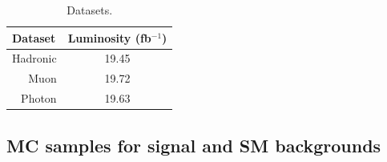 \begin{table}[h]
  \caption{Datasets.}
  \label{tab:datasets}
  \centering
  \scriptsize
  \begin{tabular}{ lc }
    \hline
    \hline
    Dataset & Luminosity (fb$^{-1}$) \\
    \hline
    \multicolumn{1}{r}{Hadronic} & 19.45 \\ [0.5ex]
    \multicolumn{1}{r}{Muon} & 19.72 \\ [0.5ex] %
    \multicolumn{1}{r}{Photon} & 19.63 \\ [0.5ex] %
    \hline
    \hline
  \end{tabular}
\end{table}

\subsection{MC samples for signal and SM backgrounds\label{sec:mc-samples}}

